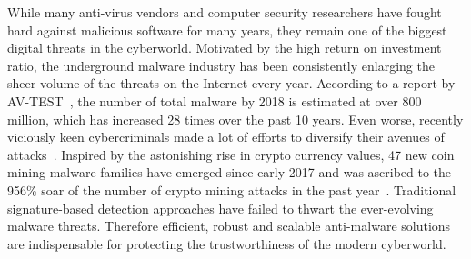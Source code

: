 \label{DL:SubSec:MC}
While many anti-virus vendors and computer security researchers have fought hard against malicious software for many years,
they remain one of the biggest digital threats in the cyberworld.
Motivated by the high return on investment ratio,
the underground malware industry has been consistently enlarging the sheer volume of the threats on the Internet every year.
According to a report by AV-TEST~\cite{AvTest}, the number of total malware by 2018 is estimated at over 800 million,
which has increased 28 times over the past 10 years.
Even worse, recently viciously keen cybercriminals made a lot of efforts to diversify their avenues of attacks~\cite{SymantecReport}.
Inspired by the astonishing rise in crypto currency values,
47 new coin mining malware families have emerged since early 2017 and was ascribed to the 956\% soar of the number of crypto mining attacks in the past year~\cite{CryptoMiningAttacks}.
Traditional signature-based detection approaches have failed to thwart the ever-evolving malware threats.
Therefore efficient, robust and scalable anti-malware solutions are indispensable for protecting the trustworthiness of the modern cyberworld.

